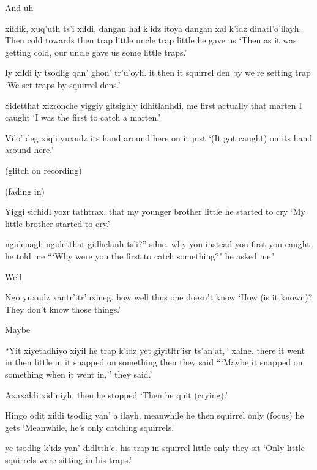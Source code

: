 \documentclass[12pt]{article}
\begin{document}
And uh

\gll xiɬdik,    xuq'uth ts'i xiɬdi, {dangan haɬ} k'idz  itoya {dangan xaɬ} k'idz  dinatl'o'ilayh.
Then cold    towards then trap         little uncle trap         little {he gave us} 
\glt `Then as it was getting cold, our uncle gave us some little traps.'
\glend

\gll  Iy xiɬdi iy tsodlig  qan' ghon' tr'u'oyh.
it  then    it squirrel den by {we're setting trap}
\glt `We set traps by squirrel dens.'
\glend

\gll Sidetthat xizronche yiggiy gitsighiy idhitlanhdi.
{me first} actually    that   marten    {I caught}
\glt `I was the first to catch a marten.'
\glend

\gll Vilo'    deg         xiq'i yuxudz 
{its hand} {around here} {on it} just
\glt `(It got caught) on its hand around here.'
\glend

(glitch on recording)

(fading in) 

\gll Yiggi sichidl            yozr   tathtrax.
  that  {my younger brother} little {he started to cry}
\glt `My little brother started to cry.'
\glend

 ngidenagh ngidetthat gidhelanh ts'i?''       siɬne.
why               {you instead}   {you first} {you caught} {} {he told me}
\glt ```Why were you the first to catch something?" he asked me.'
\glend

Well

 Ngo  yuxudz xantr'itr'uxineg.
how          well thus   {one doesn't know}
\glt `How (is it known)? They don't know those things.'
\glend

Maybe 

\gll ``Yit   xiyetadhiyo xiyiɬ {he trap} k'idz yet giyitltr'isr             ts'an'at,'' xaɬne.
there {it went in}  then {} little in {it snapped on something} then     {they said}
\glt ```Maybe it snapped on something when it went in,'' they said.'
\glend

\gll Axaxaɬdi xidiniyh.
then     {he stopped} 
\glt `Then he quit (crying).'
\glend

\gll Hingo     odit xiɬdi tsodlig  yan' a ilayh.
meanwhile he   then  squirrel only {(focus)} {he gets}
\glt `Meanwhile, he's only catching squirrels.'
\glend

 ye tsodlig  k'idz  yan' didltth'e.
{his trap}       in squirrel little only {they sit}
\glt `Only little squirrels were sitting in his traps.'
\glend
\end{document}
